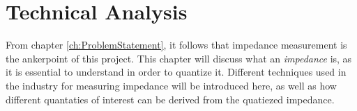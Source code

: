 \chapter{Technical Analysis} \label{ch:TechnicalAnalysis}
From chapter \ref{ch:ProblemStatement}, it follows that impedance measurement is the ankerpoint of this project. This chapter will discuss what an \textit{impedance} is, as it is essential to understand in order to quantize it. Different techniques used in the industry for measuring impedance will be introduced here, as well as how different quantaties of interest can be derived from the quatiezed impedance. 


